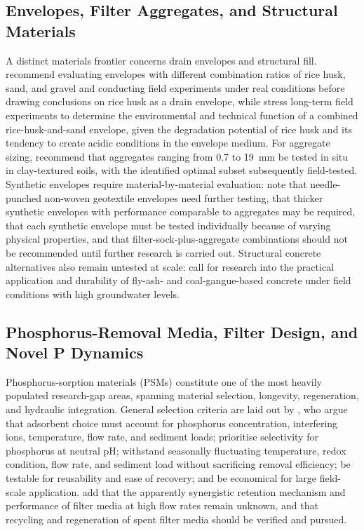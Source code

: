 \documentclass[11pt]{article}
\begin{document}
\subsection{Envelopes, Filter Aggregates, and Structural Materials}
A distinct materials frontier concerns drain envelopes and structural fill. \textcite{Kaboosi2012} recommend evaluating envelopes with different combination ratios of rice husk, sand, and gravel and conducting field experiments under real conditions before drawing conclusions on rice husk as a drain envelope, while \textcite{Navabian2017} stress long-term field experiments to determine the environmental and technical function of a combined rice-husk-and-sand envelope, given the degradation potential of rice husk and its tendency to create acidic conditions in the envelope medium. For aggregate sizing, \textcite{Byrne2023} recommend that aggregates ranging from 0.7 to 19~mm be tested in situ in clay-textured soils, with the identified optimal subset subsequently field-tested. Synthetic envelopes require material-by-material evaluation: \textcite{Byrne2023b} note that needle-punched non-woven geotextile envelopes need further testing, that thicker synthetic envelopes with performance comparable to aggregates may be required, that each synthetic envelope must be tested individually because of varying physical properties, and that filter-sock-plus-aggregate combinations should not be recommended until further research is carried out. Structural concrete alternatives also remain untested at scale: \textcite{Wang2016c} call for research into the practical application and durability of fly-ash- and coal-gangue-based concrete under field conditions with high groundwater levels.

\subsection{Phosphorus-Removal Media, Filter Design, and Novel P Dynamics}
Phosphorus-sorption materials (PSMs) constitute one of the most heavily populated research-gap areas, spanning material selection, longevity, regeneration, and hydraulic integration. General selection criteria are laid out by \textcite{Li2020}, who argue that adsorbent choice must account for phosphorus concentration, interfering ions, temperature, flow rate, and sediment loads; prioritise selectivity for phosphorus at neutral pH; withstand seasonally fluctuating temperature, redox condition, flow rate, and sediment load without sacrificing removal efficiency; be testable for reusability and ease of recovery; and be economical for large field-scale application. \textcite{Mendes2022} add that the apparently synergistic retention mechanism and performance of filter media at high flow rates remain unknown, and that recycling and regeneration of spent filter media should be verified and pursued.
\end{document}

